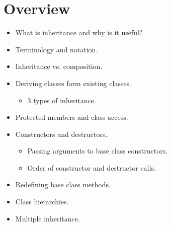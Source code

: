\section{Overview}
\begin{itemize}
    \item What is inheritance and why is it useful?
    \item Terminology and notation.
    \item Inheritance vs. composition.
    \item Deriving classes form existing classes.
        \begin{itemize}
            \item 3 types of inheritance.
        \end{itemize}
    \item Protected members and class access.
    \item Constructors and destructors.
        \begin{itemize}
            \item Passing arguments to base class constructors.
            \item Order of constructor and destructor calls.
        \end{itemize}
    \item Redefining base class methods.
    \item Class hierarchies.
    \item Multiple inheritance.
\end{itemize}


